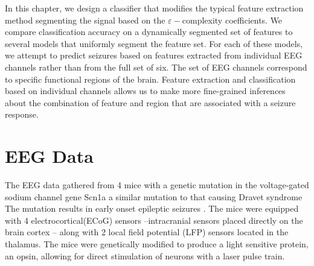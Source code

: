 In this chapter, we design a classifier that modifies
the typical feature extraction method segmenting the signal based on the $\varepsilon-$complexity coefficients. 
We compare classification accuracy on a dynamically segmented
set of features to several models that uniformly segment the feature set. For each of these models, we 
attempt to predict seizures based on features 
extracted from individual EEG channels rather than from the full set of six. The set of EEG channels correspond to specific functional regions of the brain.  
Feature extraction and classification based on individual channels allows us to make more fine-grained inferences about the combination of feature and region that are associated with a seizure response.







\section{EEG Data}

The EEG data gathered from 4 mice with a genetic 
mutation in the voltage-gated sodium channel gene Scn1a 
a similar mutation to that causing Dravet syndrome 
The mutation results in early onset epileptic seizures \cite{ito2013}.
The mice were equipped with 4 electrocortical(ECoG) sensors --intracranial sensors placed directly on the brain cortex --  
along with 2 local field potential (LFP) sensors located 
 in the thalamus.  
The mice were genetically modified to produce a light sensitive protein, an opsin, allowing for direct stimulation of neurons with a laser pulse train. 


